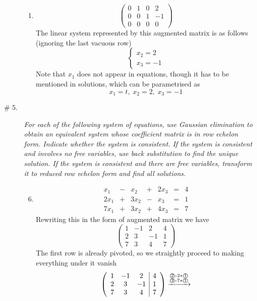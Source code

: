 \documentclass[8pt]{article} %
\newcommand{\myexplainf}[4]{#1\xrightarrow{\begin{subarray}{c}\text{#2}\\\text{#3}\end{subarray}}#4}
\begin{document}
\begin{description}
{\begin{enumerate}[label=(\alph*)]
{	The first equation can be rewritten as $x_1=3-5x_2+2x_3$, thus solutions can be parametrised as
	\[x_1=3-5v+2t,\;x_2=v,\;x_3=t,\;x_4=6\]
	}
	\item{
	\[\left(\begin{array}{ccc|c}0&1&0&2\\0&0&1&-1\\0&0&0&0\end{array}\right)\]
	The linear system represented by this augmented matrix is as follows (ignoring the last vacuous row)
	\[\begin{cases}x_2=2\\x_3=-1\end{cases}\]
	Note that $x_1$ does not appear in equations, though it has to be mentioned in solutions, which can be parametrised as 
	\[x_1=t,\;x_2=2,\;x_3=-1\]
	}
	\end{enumerate}
	}
\item[\# 5.]{
	{\it For each of the following system of equations, use Gaussian elimination to obtain an equivalent system whose coefficient
	matrix is in row echelon form. Indicate whether the system is consistent. If the system is consistent and involves no free variables,
	use back substitution to find the unique solution. If the system is consistent and there are free variables, transform it to reduced
	row echelon form and find all solutions.}
	\begin{enumerate}[label=(\alph*)]
	\setcounter{enumi}{5}\item{
	\[\begin{array}{rrrrrrr}
		x_1 & - {} & x_2 & {} + {}     &   2x_3 &  = {}& 4\\
		2x_1 & + {} & 3x_2 &  {} - {} & x_3 & = {}& 1\\
		7x_1 & + {} & 3x_2 & {} + {}  & 4x_3 &  = {}& 7
	\end{array}\]
	Rewriting this in the form of augmented matrix we have
	\[
	\left(\begin{array}{ccc|c}
		1&-1&2&4\\2&3&-1&1\\7&3&4&7
	\end{array}\right)
		\]
	The first row is already pivoted, so we straightly proceed to making everything under it vanish
	\[\myexplainf
		{\left(\begin{array}{ccc|c}1&-1&2&4\\2&3&-1&1\\7&3&4&7\end{array}\right)}
		{\textcircled{2}-2$*$\textcircled{1}}{\textcircled{3}-7$*$\textcircled{1}}
\]}
\end{enumerate}}
\end{description}
\end{document}
